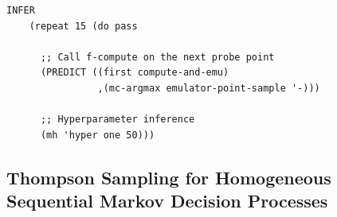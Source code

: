 \documentclass[a0,portrait]{a0poster}
\begin{document}
\begin{multicols}{3}
\begin{minipage}{\linewidth}
\begin{lstlisting}[frame=single,label=alg:structureVent,caption=Venture Code for Bayesian Optimization,mathescape]
INFER
    (repeat 15 (do pass

      ;; Call f-compute on the next probe point
      (PREDICT ((first compute-and-emu)
                ,(mc-argmax emulator-point-sample '-)))
                
      ;; Hyperparameter inference
      (mh 'hyper one 50)))
\end{lstlisting}
\end{minipage}
      
\subsection*{Thompson Sampling for Homogeneous Sequential Markov Decision Processes}




\end{multicols}
\end{document}
